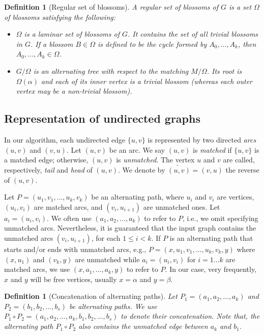 \documentclass{article}
\newcommand{\alp}{\alpha}
\newcommand{\Omg}{\Omega}
\newcommand\cev[1]{\overleftarrow{#1}}
\newtheorem{definition}[theorem]{Definition}
\begin{document}
\begin{definition}[Regular set of blossoms]
A regular set of blossoms of $G$ is a set $\Omg$ of blossoms satisfying the following:
\begin{itemize}
    \item[(C1)] $\Omg$ is a laminar set of blossoms of $G$. It contains the set of all trivial blossoms in $G$. 
    If a blossom $B \in \Omg$ is defined to be the cycle formed by $A_0, \dots, A_k$, then $A_0, \dots, A_k \in \Omg$.
    \item[(C2)] $G / \Omg$ is an alternating tree with respect to the matching $M / \Omg$. Its root is $\Omg(\alp)$ and each of its inner vertex is a trivial blossom (whereas each outer vertex may be a non-trivial blossom).
\end{itemize}    
\end{definition}





\subsection{Representation of undirected graphs}

In our algorithm, each undirected edge $\{u, v\}$ is represented by two directed \emph{arcs} $(u, v)$ and $(v, u)$.
Let $(u, v)$ be an arc.
We say $(u, v)$ is \emph{matched} if $\{u, v\}$ is a matched edge;
otherwise, $(u, v)$ is \emph{unmatched}.
The vertex $u$ and $v$ are called, respectively, \emph{tail} and \emph{head} of $(u, v)$.
We denote by $\cev{(u, v)} = (v, u)$ the reverse of $(u, v)$.



Let $P = (u_1, v_1, \dots, \allowbreak u_k, v_k)$ be an alternating path, where $u_i$ and $v_i$ are vertices, $(u_i, v_i)$ are matched arcs, and $(v_i, u_{i+1})$ are unmatched ones.
Let $a_i = (u_i, v_i)$.
We often use $(a_1, a_2, \dots, a_k)$ to refer to $P$, i.e., we omit specifying unmatched arcs.
Nevertheless, it is guaranteed that the input graph contains the unmatched arcs $(v_i, u_{i+1})$, for each $1 \leq i < k$.
If $P$ is an alternating path that starts and/or ends with unmatched arcs, e.g., $P = (x, u_1, v_1, \dots, u_k, v_k, y)$ where $(x, u_1)$ and $(v_k, y)$ are unmatched while $a_i = (u_i, v_i)$ for $i = 1 \dots k$ are matched arcs, we use $(x, a_1, . . . , a_k, y)$ to refer to $P$. In our case, very frequently, $x$ and $y$ will be free vertices, usually $x = \alp$ and $y = \beta$.

\begin{definition}[Concatenation of alternating paths]
Let $P_1 = (a_1, a_2, \dots , a_k)$ and $P_2 = (b_1, b_2, \dots , b_s)$ be alternating paths.
We use $P_1 \circ P_2 = (a_1, a_2, \dots, a_k, b_1, b_2, \dots , b_s)$ to denote their concatenation.
Note that, the alternating path $P_1 \circ P_2$ also contains the unmatched edge between $a_k$ and $b_1$.  
\end{definition}
\end{document}
